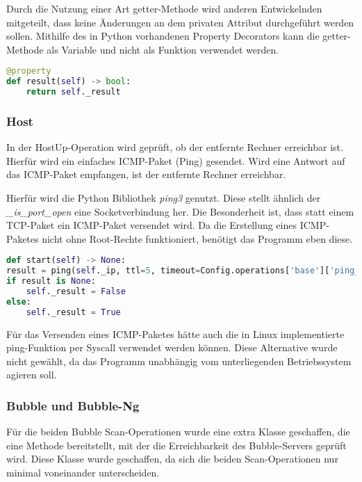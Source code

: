 Durch die Nutzung einer Art getter-Methode wird anderen Entwickelnden mitgeteilt, dass keine Änderungen an dem privaten Attribut durchgeführt werden sollen. Mithilfe des in Python vorhandenen Property Decorators kann die getter-Methode als Variable und nicht als Funktion verwendet werden.

\begin{lstlisting}[language=Python, frame=single, caption={Big Brother Ergebnis Getter-Property}, captionpos=b, label={lst:bigbrother-getter-result}]
@property
def result(self) -> bool:
	return self._result
\end{lstlisting}

\subsubsection{Host}
In der HostUp-Operation wird geprüft, ob der entfernte Rechner erreichbar ist. Hierfür wird ein einfaches ICMP-Paket (Ping) gesendet. Wird eine Antwort auf das ICMP-Paket empfangen, ist der entfernte Rechner erreichbar.

Hierfür wird die Python Bibliothek \textit{ping3} genutzt. Diese stellt ähnlich der \textit{\_is\_port\_open} eine Socketverbindung her. Die Besonderheit ist, dass statt einem TCP-Paket ein ICMP-Paket versendet wird. Da die Erstellung eines ICMP-Paketes nicht ohne Root-Rechte funktioniert, benötigt das Programm eben diese.

\begin{lstlisting}[language=Python, frame=single, caption={Big Brother HostUp Ping}, captionpos=b, label={lst:bigbrother-host-up}]
def start(self) -> None:
result = ping(self._ip, ttl=5, timeout=Config.operations['base']['ping_timeout'])
if result is None:
	self._result = False
else:
	self._result = True
\end{lstlisting}

Für das Versenden eines ICMP-Paketes hätte auch  die in Linux implementierte ping-Funktion per Syscall verwendet werden können. Diese Alternative wurde nicht gewählt, da das Programm unabhängig vom unterliegenden Betriebssystem agieren soll.
 
\subsubsection{Bubble und Bubble-Ng}
Für die beiden Bubble Scan-Operationen wurde eine extra Klasse geschaffen, die eine Methode bereitstellt, mit der die Erreichbarkeit des Bubble-Servers geprüft wird. Diese Klasse wurde geschaffen, da sich die beiden Scan-Operationen nur minimal voneinander unterscheiden.

